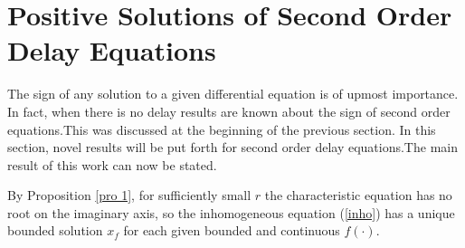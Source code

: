 \documentclass[12pt,letterpaper]{amsart}
\theoremstyle{definition}
\theoremstyle{remark}
\numberwithin{equation}{section}
\begin{document}
\section{Positive Solutions of Second Order Delay Equations}\label{positivity}
The sign of any solution to a given differential equation is of upmost importance. In fact, when there is no delay results are known about the sign of second order equations.This was discussed at the beginning of the previous section. In this section, novel results will be put forth for second order delay equations.The main result of this work can now be stated. 


\bigskip
By Proposition \ref{pro 1}, for sufficiently small $r$ the characteristic equation has no root on the imaginary axis, so the inhomogeneous equation (\ref{inho}) has a unique bounded solution $x_f$ for each given bounded and continuous $f(\cdot )$.
\end{document}
